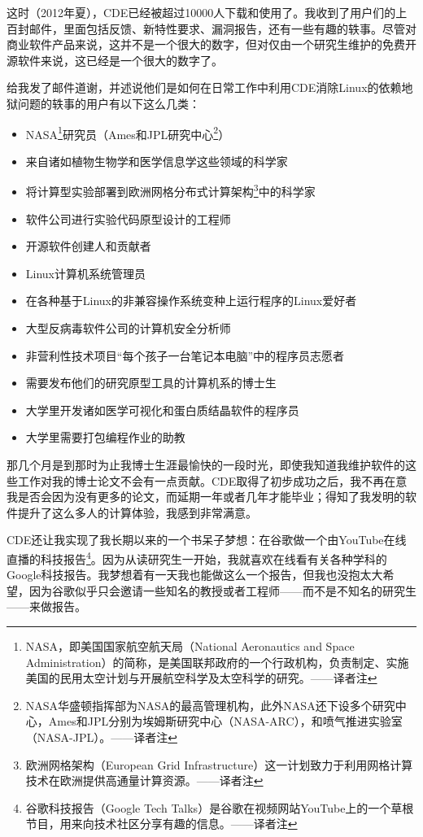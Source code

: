 \documentclass[12pt,UTF8,nofonts]{book}
\begin{document}
这时（2012年夏），CDE已经被超过10000人下载和使用了。我收到了用户们的上百封邮件，里面包括反馈、新特性要求、漏洞报告，还有一些有趣的轶事。尽管对商业软件产品来说，这并不是一个很大的数字，但对仅由一个研究生维护的免费开源软件来说，这已经是一个很大的数字了。

给我发了邮件道谢，并述说他们是如何在日常工作中利用CDE消除Linux的依赖地狱问题的轶事的用户有以下这么几类：
\begin{itemize}
  \item NASA\footnote{NASA，即美国国家航空航天局（National Aeronautics and Space Administration）的简称，是美国联邦政府的一个行政机构，负责制定、实施美国的民用太空计划与开展航空科学及太空科学的研究。——译者注}研究员（Ames和JPL研究中心\footnote{NASA华盛顿指挥部为NASA的最高管理机构，此外NASA还下设多个研究中心，Ames和JPL分别为埃姆斯研究中心（NASA-ARC），和喷气推进实验室（NASA-JPL）。——译者注}）
  \item 来自诸如植物生物学和医学信息学这些领域的科学家
  \item 将计算型实验部署到欧洲网格分布式计算架构\footnote{欧洲网格架构（European Grid Infrastructure）这一计划致力于利用网格计算技术在欧洲提供高通量计算资源。——译者注}中的科学家
  \item 软件公司进行实验代码原型设计的工程师
  \item 开源软件创建人和贡献者
  \item Linux计算机系统管理员
  \item 在各种基于Linux的非兼容操作系统变种上运行程序的Linux爱好者
  \item 大型反病毒软件公司的计算机安全分析师
  \item 非营利性技术项目“每个孩子一台笔记本电脑”中的程序员志愿者
  \item 需要发布他们的研究原型工具的计算机系的博士生
  \item 大学里开发诸如医学可视化和蛋白质结晶软件的程序员
  \item 大学里需要打包编程作业的助教
\end{itemize}
那几个月是到那时为止我博士生涯最愉快的一段时光，即使我知道我维护软件的这些工作对我的博士论文不会有一点贡献。CDE取得了初步成功之后，我不再在意我是否会因为没有更多的论文，而延期一年或者几年才能毕业；得知了我发明的软件提升了这么多人的计算体验，我感到非常满意。

\breakline

CDE还让我实现了我长期以来的一个书呆子梦想：在谷歌做一个由YouTube在线直播的科技报告\footnote{谷歌科技报告（Google Tech Talks）是谷歌在视频网站YouTube上的一个草根节目，用来向技术社区分享有趣的信息。——译者注}。因为从读研究生一开始，我就喜欢在线看有关各种学科的Google科技报告。我梦想着有一天我也能做这么一个报告，但我也没抱太大希望，因为谷歌似乎只会邀请一些知名的教授或者工程师——而不是不知名的研究生——来做报告。
\end{document}
